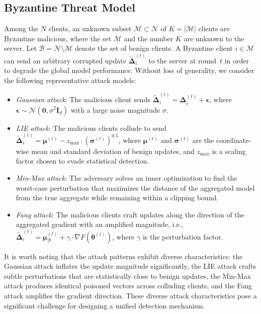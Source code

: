 \subsection{Byzantine Threat Model}

Among the $N$ clients, an unknown subset $\mathcal{M} \subset \mathcal{N}$ of $K = |\mathcal{M}|$ clients are Byzantine malicious, where the set $\mathcal{M}$ and the number $K$ are unknown to the server. Let $\mathcal{B} = \mathcal{N} \setminus \mathcal{M}$ denote the set of benign clients. A Byzantine client $i \in \mathcal{M}$ can send an arbitrary corrupted update $\widetilde{\boldsymbol{\Delta}}_i^{(t)}$ to the server at round~$t$ in order to degrade the global model performance. Without loss of generality, we consider the following representative attack models:

\begin{itemize}
    \item \textit{Gaussian attack}: The malicious client sends $\widetilde{\boldsymbol{\Delta}}_i^{(t)} = \boldsymbol{\Delta}_i^{(t)} + \boldsymbol{\epsilon}$, where $\boldsymbol{\epsilon} \sim \mathcal{N}(\mathbf{0}, \sigma^2 \mathbf{I}_d)$ with a large noise magnitude $\sigma$.
    \item \textit{LIE attack}: The malicious clients collude to send $\widetilde{\boldsymbol{\Delta}}_i^{(t)} = \boldsymbol{\mu}^{(t)} - z_{\max} \cdot (\boldsymbol{\sigma}^{(t)})^{0.5}$, where $\boldsymbol{\mu}^{(t)}$ and $\boldsymbol{\sigma}^{(t)}$ are the coordinate-wise mean and standard deviation of benign updates, and $z_{\max}$ is a scaling factor chosen to evade statistical detection.
    \item \textit{Min-Max attack}: The adversary solves an inner optimization to find the worst-case perturbation that maximizes the distance of the aggregated model from the true aggregate while remaining within a clipping bound.
    \item \textit{Fang attack}: The malicious clients craft updates along the direction of the aggregated gradient with an amplified magnitude, i.e., $\widetilde{\boldsymbol{\Delta}}_i^{(t)} = \boldsymbol{\mu}_{\mathcal{B}}^{(t)} + \gamma \cdot \nabla F(\boldsymbol{\theta}^{(t)})$, where $\gamma$ is the perturbation factor.
\end{itemize}

It is worth noting that the attack patterns exhibit diverse characteristics: the Gaussian attack inflates the update magnitude significantly, the LIE attack crafts subtle perturbations that are statistically close to benign updates, the Min-Max attack produces identical poisoned vectors across colluding clients, and the Fang attack amplifies the gradient direction. These diverse attack characteristics pose a significant challenge for designing a unified detection mechanism.

